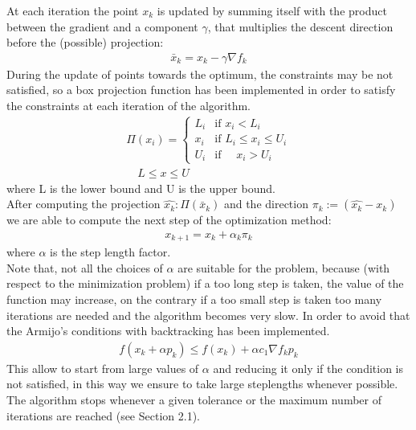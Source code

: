 \documentclass{article}
\begin{document}
At each iteration the point $x_{k}$ is updated by summing itself with the product between the gradient and a component $\gamma$, that multiplies the descent direction before the (possible) projection: 
\begin{gather}
    \bar x_{k} = x_{k}-\gamma \nabla f_{k}
\end{gather}
During the update of points towards the optimum, the constraints may be not satisfied, so a box projection function has been implemented in order to satisfy the constraints at each iteration of the algorithm.
\begin{gather}
    \Pi(x_{i}) = \begin{cases} 
    L_{i} & \mbox{if } x_{i} < L_{i}\\ 
    x_{i} & \mbox{if } L_{i} \leq x_{i} \leq U_{i}\\
    U_{i} & \mbox{if } \quad x_{i} > U_{i}
    \end{cases}\\
    \quad L \leq x \leq U \quad
\end{gather}
where L is the lower bound and U is the upper bound.\\
After computing the projection $\hat{x_{k}}: \Pi(\bar x_{k})$ and the direction $\pi_{k}:= (\hat{x_{k}}- x_{k})$ we are able to compute  the next step of the optimization method:
\begin{gather}
     x_{k+1} = x_{k}+\alpha_{k}\pi_k
\end{gather}
where $\alpha$ is the step length factor.\\
Note that, not all the choices of $\alpha$ are suitable for the problem, because (with respect to the minimization problem) if a too long step
is taken, the value of the function may increase, on the contrary if a too small step is taken too many iterations are needed and the algorithm becomes very slow. In order to avoid that the Armijo's conditions with backtracking has been implemented.
\begin{gather}
    f(x_{k}+ \alpha  p_{k}) \leq   f(x_{k})+ \alpha c_{1}\nabla f_{k} p_{k}
\end{gather}
This allow to start from large values of $\alpha$ and reducing it only if the condition is not satisfied, in this way we
ensure to take large steplengths whenever possible.\\
The algorithm stops whenever a given tolerance or the maximum number of iterations are reached (see Section 2.1).
\end{document}
